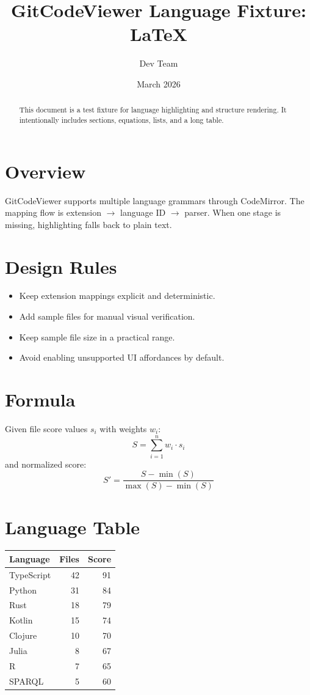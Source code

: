 \documentclass[11pt,a4paper]{article}
\title{GitCodeViewer Language Fixture: LaTeX}
\author{Dev Team}
\date{March 2026}
\begin{document}
\maketitle

\begin{abstract}
This document is a test fixture for language highlighting and structure rendering.
It intentionally includes sections, equations, lists, and a long table.
\end{abstract}

\section{Overview}
GitCodeViewer supports multiple language grammars through CodeMirror.
The mapping flow is extension $\rightarrow$ language ID $\rightarrow$ parser.
When one stage is missing, highlighting falls back to plain text.

\section{Design Rules}
\begin{itemize}
  \item Keep extension mappings explicit and deterministic.
  \item Add sample files for manual visual verification.
  \item Keep sample file size in a practical range.
  \item Avoid enabling unsupported UI affordances by default.
\end{itemize}

\section{Formula}
Given file score values $s_i$ with weights $w_i$:
\begin{equation}
S = \sum_{i=1}^{n} w_i \cdot s_i
\end{equation}
and normalized score:
\begin{equation}
S' = \frac{S - \min(S)}{\max(S) - \min(S)}
\end{equation}

\section{Language Table}
\begin{longtable}{lrr}
\toprule
Language & Files & Score \\
\midrule
TypeScript & 42 & 91 \\
Python & 31 & 84 \\
Rust & 18 & 79 \\
Kotlin & 15 & 74 \\
Clojure & 10 & 70 \\
Julia & 8 & 67 \\
R & 7 & 65 \\
SPARQL & 5 & 60 \\
\bottomrule
\end{longtable}
\end{document}
